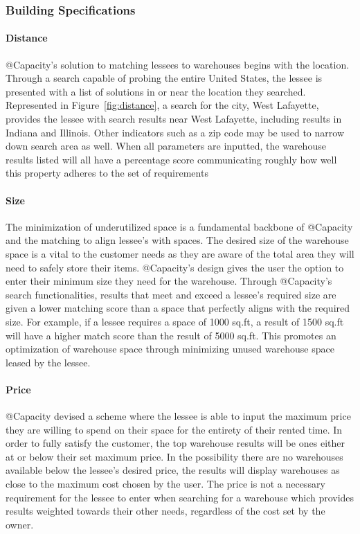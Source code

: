 \subsubsection{Building Specifications}
\paragraph{Distance}
@Capacity's solution to matching lessees to warehouses begins with the location.  Through a search capable of probing the entire United States, the lessee is presented with a list of solutions in or near the location they searched.  Represented in Figure~\ref{fig:distance}, a search for the city, West Lafayette, provides the lessee with search results near West Lafayette, including results in Indiana and Illinois. Other indicators such as a zip code may be used to narrow down search area as well. When all parameters are inputted, the warehouse results listed will all have a percentage score communicating roughly how well this property adheres to the set of requirements

\paragraph{Size}
The minimization of underutilized space is a fundamental backbone of @Capacity and the matching to align lessee's with spaces.  The desired size of the warehouse space is a vital to the customer needs as they are aware of the total area they will need to safely store their items. @Capacity's design gives the user the option to enter their minimum size they need for the warehouse. Through @Capacity's search functionalities, results that meet and exceed a lessee's required size are given a lower matching score than a space that perfectly aligns with the required size.  For example, if a lessee requires a space of 1000 sq.ft, a result of 1500 sq.ft will have a higher match score than the result of 5000 sq.ft.  This promotes an optimization of warehouse space through minimizing unused warehouse space leased by the lessee.

\paragraph{Price}
@Capacity devised a scheme where the lessee is able to input the maximum price they are willing to spend on their space for the entirety of their rented time. In order to fully satisfy the customer, the top warehouse results will be ones either at or below their set maximum price. In the possibility there are no warehouses available below the lessee's desired price, the results will display warehouses as close to the maximum cost chosen by the user. The price is not a necessary requirement for the lessee to enter when searching for a warehouse which provides results weighted towards their other needs, regardless of the cost set by the owner. 

